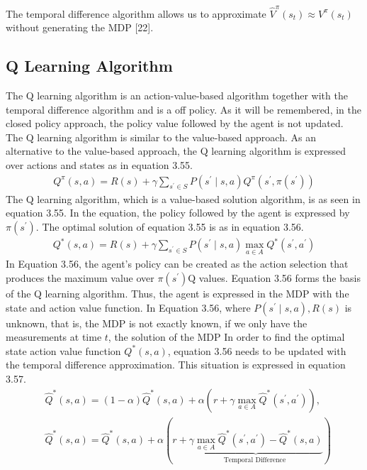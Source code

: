 \documentclass[12pt,twoside,a4]{mwbk}
\begin{document}
\noindent The temporal difference algorithm allows us to approximate $\hat{V}^{\pi}\left(s_{t}\right) \approx V^{\pi}\left(s_{t}\right)$ without generating the MDP [22].

\subsection{Q Learning Algorithm}
The Q learning algorithm is an action-value-based algorithm together with the temporal difference algorithm and is a off policy. As it will be remembered, in the closed policy approach, the policy value followed by the agent is not updated. The Q learning algorithm is similar to the value-based approach. As an alternative to the value-based approach, the Q learning algorithm is expressed over actions and states as in equation 3.55.
\begin{subequations}
\begin{align}
    Q^{\pi}(s, a)=R(s)+\gamma \sum_{s^{\prime} \in S} P\left(s^{\prime} \mid s, a\right) Q^{\pi}\left(s^{\prime}, \pi\left(s^{\prime}\right)\right)
\end{align}
\end{subequations}
The Q learning algorithm, which is a value-based solution algorithm, is as seen in equation 3.55. In the equation, the policy followed by the agent is expressed by $\pi\left(s^{\prime}\right)$. The optimal solution of equation 3.55 is as in equation 3.56.
\begin{subequations}
\begin{align}
    Q^{*}(s, a)=R(s)+\gamma \sum_{s^{\prime} \in S} P\left(s^{\prime} \mid s, a\right) \max _{a \in A} Q^{*}\left(s^{\prime}, a^{\prime}\right)
\end{align}
\end{subequations}
In Equation 3.56, the agent's policy can be created as the action selection that produces the maximum value over $\pi\left(s^{\prime}\right) \mathrm{Q}$ values. Equation 3.56 forms the basis of the Q learning algorithm. Thus, the agent is expressed in the MDP with the state and action value function. In Equation 3.56, where $P\left(s^{\prime} \mid s, a\right), R(s)$ is unknown, that is, the MDP is not exactly known, if we only have the measurements at time $t$, the solution of the MDP In order to find the optimal state action value function $Q^{*}(s, a)$, equation 3.56 needs to be updated with the temporal difference approximation. This situation is expressed in equation 3.57.
\begin{subequations}
\begin{align}
    &\widehat{Q}^{*}(s, a)=(1-\alpha) \hat{Q}^{*}(s, a)+\alpha\left(r+\gamma \max _{a \in A} \hat{Q}^{*}\left(s^{\prime}, a^{\prime}\right)\right), \\
&\hat{Q}^{*}(s, a)=\widehat{Q}^{*}(s, a)+\alpha(r+\underbrace{\gamma \max _{a \in A} \widehat{Q}^{*}\left(s^{\prime}, a^{\prime}\right)-\widehat{Q}^{*}(s, a)}_{\text {Temporal Difference }})
\end{align}
\end{subequations}
\end{document}
